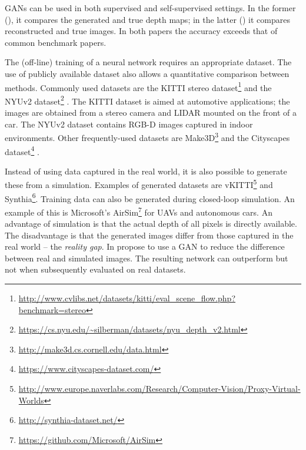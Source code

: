 \acp{GAN} can be used in both supervised and self-supervised settings.
In the former (\cite{Chen2018}), it compares the generated and true depth maps; in the latter (\cite{Pilzer2018a}) it compares reconstructed and true images.
In both papers the accuracy exceeds that of common benchmark papers.

\medskip

The (off-line) training of a neural network requires an appropriate dataset.
The use of publicly available dataset also allows a quantitative comparison between methods.
Commonly used datasets are the KITTI stereo dataset\footnote{\url{http://www.cvlibs.net/datasets/kitti/eval_scene_flow.php?benchmark=stereo}} and the NYUv2 dataset\footnote{\url{https://cs.nyu.edu/~silberman/datasets/nyu_depth_v2.html}} \cite{Silberman2012}.
The KITTI dataset is aimed at automotive applications; the images are obtained from a stereo camera and LIDAR mounted on the front of a car.
The NYUv2 dataset contains RGB-D images captured in indoor environments.
Other frequently-used datasets are Make3D\footnote{\url{http://make3d.cs.cornell.edu/data.html}} \cite{Saxena2006,Saxena2007,Saxena2009} and the Cityscapes dataset\footnote{\url{https://www.cityscapes-dataset.com/}} \cite{Cordts2016a}.

Instead of using data captured in the real world, it is also possible to generate these from a simulation.
Examples of generated datasets are vKITTI\footnote{\url{http://www.europe.naverlabs.com/Research/Computer-Vision/Proxy-Virtual-Worlds}} \cite{Gaidon2016} and Synthia\footnote{\url{http://synthia-dataset.net/}}.
Training data can also be generated during closed-loop simulation.
An example of this is Microsoft's AirSim\footnote{\url{https://github.com/Microsoft/AirSim}} for \acp{UAV} and autonomous cars.
An advantage of simulation is that the actual depth of all pixels is directly available.
The disadvantage is that the generated images differ from those captured in the real world -- the \emph{reality gap}.
In \cite{Zheng2018} \citeauthor{Zheng2018} propose to use a \ac{GAN} to reduce the difference between real and simulated images.
The resulting network can outperform \cite{Eigen2014} but not \cite{Garg2016,Godard2017} when subsequently evaluated on real datasets.



